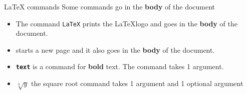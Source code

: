 \copyrightTim

\begin{frame}[fragile]{LaTeX commands}
    Some commands go in the \textbf{body} of the document
    \newline
    \begin{itemize}
    \item The command \texttt{\LaTeX} prints the \LaTeX logo and goes in the \textbf{body} of the document. \newline

    \item \texttt{\newpage} starts a new page and it also goes in the \textbf{body} of the document.
    \newline

    \item \texttt{\textbf{text}} is a command for \textbf{bold} text. The command takes 1 argument.
    \newline
    \item \texttt{}  \(\sqrt[3]{y}\) the square root command takes 1 argument and 1 optional argument
    \end{itemize}
\end{frame}